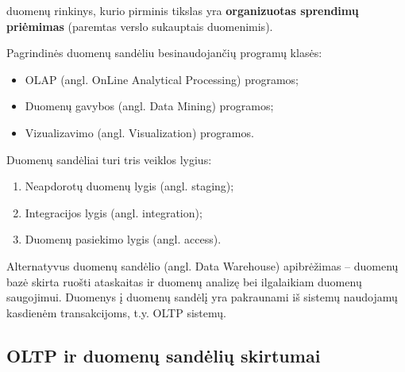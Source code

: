 \documentclass[12pt,a4paper,titlepage]{article}
\begin{document}
duomenų rinkinys, kurio pirminis tikslas yra \textbf{organizuotas sprendimų priėmimas} (paremtas verslo sukauptais duomenimis).

Pagrindinės duomenų sandėliu besinaudojančių programų klasės:
\begin{itemize}
  \item OLAP (angl. OnLine Analytical Processing) programos;
  \item Duomenų gavybos (angl. Data Mining) programos;
  \item Vizualizavimo (angl. Visualization) programos.
\end{itemize}

Duomenų sandėliai turi tris veiklos lygius:
\begin{enumerate}
  \item Neapdorotų duomenų lygis (angl. staging);
  \item Integracijos lygis (angl. integration);
  \item Duomenų pasiekimo lygis (angl. access).
\end{enumerate}

Alternatyvus duomenų sandėlio (angl. Data Warehouse) apibrėžimas – duomenų bazė skirta ruošti ataskaitas ir duomenų analizę bei ilgalaikiam duomenų saugojimui. Duomenys į duomenų sandėlį yra pakraunami iš sistemų naudojamų kasdienėm transakcijoms, t.y. OLTP sistemų. 

\subsection{OLTP ir duomenų sandėlių skirtumai}
\end{document}
